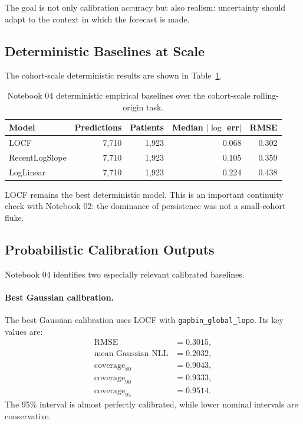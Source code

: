 \documentclass[11pt,a4paper]{article}
\begin{document}
The goal is not only calibration accuracy but also realism: uncertainty should adapt to the context in which the forecast is made.

\subsection{Deterministic Baselines at Scale}

The cohort-scale deterministic results are shown in Table~\ref{tab:n04-det}.

\begin{table}[H]
\centering
\small
\caption{Notebook 04 deterministic empirical baselines over the cohort-scale rolling-origin task.}
\label{tab:n04-det}
\begin{tabular}{lrrrr}
\toprule
Model & Predictions & Patients & Median $|\log$ err$|$ & RMSE \\
\midrule
LOCF & 7,710 & 1,923 & 0.068 & 0.302 \\
RecentLogSlope & 7,710 & 1,923 & 0.105 & 0.359 \\
LogLinear & 7,710 & 1,923 & 0.224 & 0.438 \\
\bottomrule
\end{tabular}
\end{table}

LOCF remains the best deterministic model. This is an important continuity check with Notebook 02: the dominance of persistence was not a small-cohort fluke.

\subsection{Probabilistic Calibration Outputs}

Notebook 04 identifies two especially relevant calibrated baselines.

\paragraph{Best Gaussian calibration.}
The best Gaussian calibration uses LOCF with \texttt{gapbin\_global\_lopo}. Its key values are:
\[
\begin{aligned}
    \text{RMSE} &= 0.3015,\\
    \text{mean Gaussian NLL} &= 0.2032,\\
    \text{coverage}_{80} &= 0.9043,\\
    \text{coverage}_{90} &= 0.9333,\\
    \text{coverage}_{95} &= 0.9514.
\end{aligned}
\]
The 95\% interval is almost perfectly calibrated, while lower nominal intervals are conservative.
\end{document}
